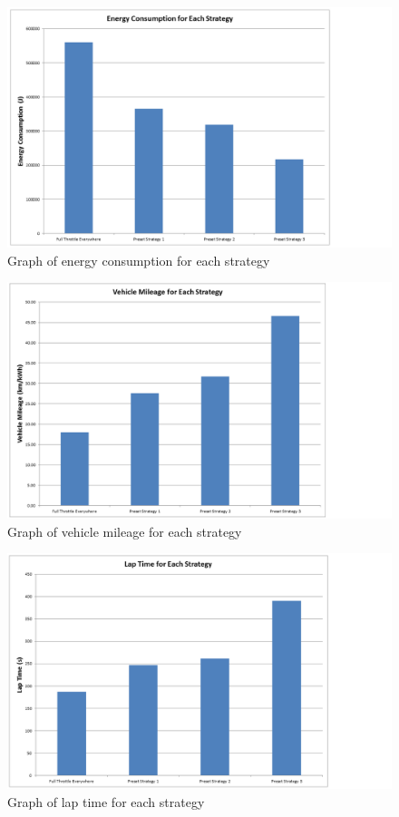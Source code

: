 \begin{figure}[htb]
	\centering
	\includegraphics[width=5in]{images/energy.png}
	\caption{Graph of energy consumption for each strategy}
	\label{im:energyHist}
\end{figure}

\begin{figure}[htb]
	\centering
	\includegraphics[width=5in]{images/mileage.png}
	\caption{Graph of vehicle mileage for each strategy}
	\label{im:mileageHist}
\end{figure}

\begin{figure}[htb]
	\centering
	\includegraphics[width=5in]{images/laptime.png}
	\caption{Graph of lap time for each strategy}
	\label{im:laptimeHist}
\end{figure}

